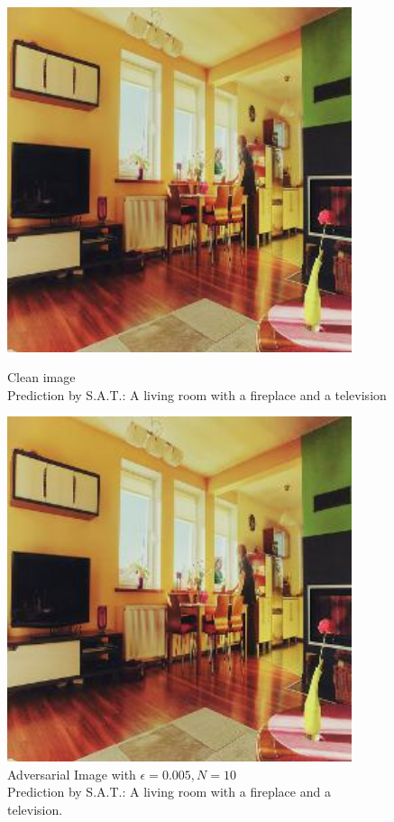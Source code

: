 \begin{figure}[ht]
    \centering
    \begin{minipage}{0.45\textwidth}
        \centering
        \includegraphics[width=0.9\textwidth]{figures/ShowDistractAndDeceive/n=10/samples/0.000/img_0.jpg} %
        \caption*{Clean image\\Prediction by S.A.T.: A living room with a fireplace and a television}
    \end{minipage}\hfill
    \begin{minipage}{0.45\textwidth}
        \centering
        \includegraphics[width=0.9\textwidth]{figures/ShowDistractAndDeceive/n=10/samples/0.005/img_0.jpg} %
        \caption*{Adversarial Image with $\epsilon=0.005, N=10$\\Prediction by S.A.T.: A living room with a fireplace and a television.}
    \end{minipage}
\end{figure}

